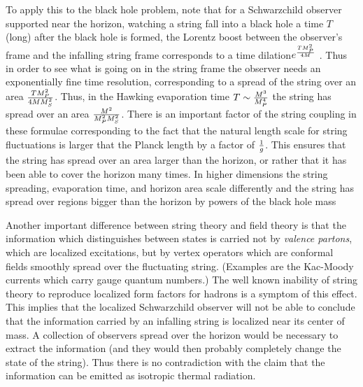 To apply this to the black hole problem, note that for a Schwarzchild
observer supported near the horizon, watching a string fall into
a black hole a time $T$ (long) after the black hole is formed, the Lorentz
boost
between the observer's frame and the infalling string frame corresponds
to a time dilation$e^{T M_P^2\over 4M}$ .
Thus in order to see what is going on in the string frame the observer needs
an exponentially fine time resolution,
corresponding to a spread of the string over an area $ {T M_P^2 \over
4M M_S^{2} }$.  Thus,
in the Hawking evaporation time $T\sim {M^3\over M_P^4}$
the string has spread over an area ${M^2 \over M_P^2 M_S^2}   $.  There is an
important factor of the string coupling in these formulae
corresponding to the fact that the natural length scale for string
fluctuations is larger that the Planck length
by a factor of $1\over g$.  This ensures that the string has spread over an
area larger than the horizon, or rather that
it has been able to cover the horizon many times.  In higher dimensions the
string spreading, evaporation time, and horizon
area scale differently and the string has spread over regions bigger
than the horizon by powers of the black hole mass

Another important difference between string theory and field theory is that
the information which distinguishes between states
is carried not by {\it valence partons}, which are localized excitations, but
by vertex operators which are conformal fields
smoothly spread over the fluctuating string.  (Examples are the Kac-Moody
currents which carry gauge quantum numbers.)
The well known inability of string theory to reproduce localized form factors
for hadrons is a symptom of this effect.
This implies that the localized Schwarzchild observer will not be able to
conclude that the information
carried by an infalling string is localized near its center of mass.  A
collection of observers spread over the horizon
would be necessary to extract the information (and they would then probably
completely change the state of the string).
Thus there is no contradiction with the claim that the information can be
emitted as isotropic thermal radiation.

